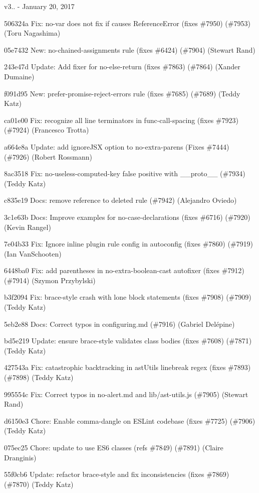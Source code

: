 v3.. -\/ January 20, 2017


\begin{DoxyItemize}
\item 506324a Fix\+: {\ttfamily no-\/var} does not fix if causes Reference\+Error (fixes \#7950) (\#7953) (Toru Nagashima)
\item 05e7432 New\+: no-\/chained-\/assignments rule (fixes \#6424) (\#7904) (Stewart Rand)
\item 243e47d Update\+: Add fixer for no-\/else-\/return (fixes \#7863) (\#7864) (Xander Dumaine)
\item f091d95 New\+: {\ttfamily prefer-\/promise-\/reject-\/errors} rule (fixes \#7685) (\#7689) (Teddy Katz)
\item ca01e00 Fix\+: recognize all line terminators in func-\/call-\/spacing (fixes \#7923) (\#7924) (Francesco Trotta)
\item a664e8a Update\+: add ignore\+J\+SX option to no-\/extra-\/parens (Fixes \#7444) (\#7926) (Robert Rossmann)
\item 8ac3518 Fix\+: no-\/useless-\/computed-\/key false positive with {\ttfamily \+\_\+\+\_\+proto\+\_\+\+\_\+} (\#7934) (Teddy Katz)
\item c835e19 Docs\+: remove reference to deleted rule (\#7942) (Alejandro Oviedo)
\item 3c1e63b Docs\+: Improve examples for no-\/case-\/declarations (fixes \#6716) (\#7920) (Kevin Rangel)
\item 7e04b33 Fix\+: Ignore inline plugin rule config in autoconfig (fixes \#7860) (\#7919) (Ian Van\+Schooten)
\item 6448ba0 Fix\+: add parentheses in no-\/extra-\/boolean-\/cast autofixer (fixes \#7912) (\#7914) (Szymon Przybylski)
\item b3f2094 Fix\+: brace-\/style crash with lone block statements (fixes \#7908) (\#7909) (Teddy Katz)
\item 5eb2e88 Docs\+: Correct typos in configuring.\+md (\#7916) (Gabriel Delépine)
\item bd5e219 Update\+: ensure brace-\/style validates class bodies (fixes \#7608) (\#7871) (Teddy Katz)
\item 427543a Fix\+: catastrophic backtracking in ast\+Utils linebreak regex (fixes \#7893) (\#7898) (Teddy Katz)
\item 995554c Fix\+: Correct typos in no-\/alert.\+md and lib/ast-\/utils.\+js (\#7905) (Stewart Rand)
\item d6150e3 Chore\+: Enable comma-\/dangle on E\+S\+Lint codebase (fixes \#7725) (\#7906) (Teddy Katz)
\item 075ec25 Chore\+: update to use E\+S6 classes (refs \#7849) (\#7891) (Claire Dranginis)
\item 55f0cb6 Update\+: refactor brace-\/style and fix inconsistencies (fixes \#7869) (\#7870) (Teddy Katz)
\end{DoxyItemize}

